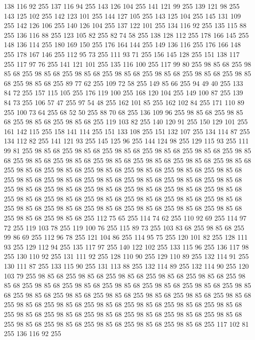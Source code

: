 138 116 92 255 137 116 94 255 143 126 104 255 141 121 99 255 139 121 98 255 143 125 102 255 142 123 101 255 144 127 105 255 143 125 104 255 145 131 109 255 142 126 106 255 140 126 104 255 137 122 101 255 134 116 92 255 135 115 88 255 136 116 88 255 123 105 82 255 82 74 58 255 138 128 112 255 178 166 145 255 148 136 114 255 180 169 150 255 176 164 144 255 149 136 116 255 176 166 148 255 178 167 146 255 112 95 73 255 111 93 71 255 156 145 128 255 151 138 117 255 117 97 76 255 141 121 101 255 135 116 100 255 117 99 80 255 98 85 68 255 98 85 68 255 98 85 68 255 98 85 68 255 98 85 68 255 98 85 68 255 98 85 68 255 98 85 68 255 98 85 68 255 89 77 62 255 109 72 58 255 149 85 66 255 94 49 40 255 133 84 72 255 157 115 105 255 176 119 100 255 168 120 104 255 149 100 87 255 139 84 73 255 106 57 47 255 97 54 48 255 162 101 85 255 162 102 84 255 171 110 89 255 100 73 64 255 68 52 50 255 88 70 68 255 136 109 96 255 98 85 68 255 98 85 68 255
98 85 68 255 98 85 68 255 119 103 82 255 140 120 91 255 150 129 101 255 161 142 115 255 158 141 114 255 151 133 108 255 151 132 107 255 134 114 87 255 134 112 82 255 141 121 93 255 145 125 96 255 144 124 98 255 129 115 93 255 111 99 81 255 98 85 68 255 98 85 68 255 98 85 68 255 98 85 68 255 98 85 68 255 98 85 68 255 98 85 68 255 98 85 68 255 98 85 68 255 98 85 68 255 98 85 68 255 98 85 68 255 98 85 68 255 98 85 68 255 98 85 68 255 98 85 68 255 98 85 68 255 98 85 68 255 98 85 68 255 98 85 68 255 98 85 68 255 98 85 68 255 98 85 68 255 98 85 68 255 98 85 68 255 98 85 68 255 98 85 68 255 98 85 68 255 98 85 68 255 98 85 68 255 98 85 68 255 98 85 68 255 98 85 68 255 98 85 68 255 98 85 68 255 98 85 68 255 98 85 68 255 98 85 68 255 98 85 68 255 98 85 68 255 98 85 68 255 98 85 68 255 98 85 68 255 98 85 68 255 112 75 65 255 114 74 62 255 110 92 69 255 114 97 72 255
119 103 78 255 119 100 76 255 115 89 73 255 103 83 68 255 98 85 68 255 99 86 69 255 112 96 78 255 121 104 86 255 114 95 75 255 120 101 82 255 128 111 93 255 129 112 94 255 135 117 97 255 140 122 102 255 133 115 96 255 136 117 98 255 130 110 92 255 131 111 92 255 128 110 90 255 129 110 89 255 132 114 91 255 130 111 87 255 133 115 90 255 131 113 88 255 132 114 89 255 132 114 90 255 120 103 79 255 98 85 68 255 98 85 68 255 98 85 68 255 98 85 68 255 98 85 68 255 98 85 68 255 98 85 68 255 98 85 68 255 98 85 68 255 98 85 68 255 98 85 68 255 98 85 68 255 98 85 68 255 98 85 68 255 98 85 68 255 98 85 68 255 98 85 68 255 98 85 68 255 98 85 68 255 98 85 68 255 98 85 68 255 98 85 68 255 98 85 68 255 98 85 68 255 98 85 68 255 98 85 68 255 98 85 68 255 98 85 68 255 98 85 68 255 98 85 68 255 98 85 68 255 98 85 68 255 98 85 68 255 98 85 68 255 98 85 68 255 117 102 81 255 136 116 92 255
